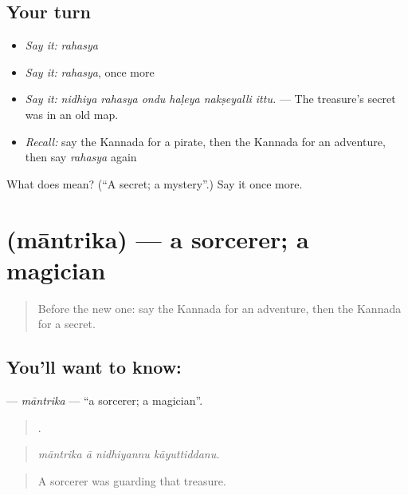 \subsection*{Your turn}
\begin{itemize}
\raggedright
  \item \emph{Say it:} \emph{rahasya}
  \item \emph{Say it:} \emph{rahasya}, once more
  \item \emph{Say it:} \emph{nidhiya rahasya ondu haḷeya nakṣeyalli ittu.} — The treasure's secret was in an old map.
  \item \emph{Recall:} say the Kannada for a pirate, then the Kannada for an adventure, then say \emph{rahasya} again
\end{itemize}

\begin{tcolorbox}[breakable,colback=teal!4,colframe=teal!35!black,title={Before you move on}]
What does  mean? (\textquotedblleft{}A secret; a mystery\textquotedblright{}.) Say it once more.
\end{tcolorbox}
\section[\texorpdfstring{\kn{ಮಾಂತ್ರಿಕ} (māntrika)}{ಮಾಂತ್ರಿಕ (māntrika)}]{ (māntrika) — a sorcerer; a magician}

\label{lesson:KA-C348-mantrika}



\begin{quote}
Before the new one: say the Kannada for an adventure, then the Kannada for a secret.
\end{quote}

\subsection*{You'll want to know: }
\textbf{} — \emph{māntrika} — \textquotedblleft{}a sorcerer; a magician\textquotedblright{}.

\begin{quote}
   .
\end{quote}

\begin{quote}
\emph{māntrika ā nidhiyannu kāyuttiddanu.}
\end{quote}

\begin{quote}
A sorcerer was guarding that treasure.
\end{quote}

